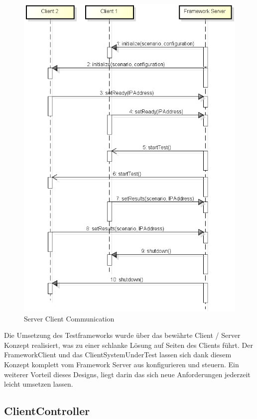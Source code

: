 \begin{figure}[H]
\begin{center}
\includegraphics[scale=0.5]{image_testFramework/Server_Client_Communication.png}
\end{center}
\caption{Server Client Communication}
\end{figure}

Die Umsetzung des Testframeworks wurde über das bewährte Client / Server Konzept realisiert, was zu einer schlanke Lösung auf Seiten des Clients führt. Der FrameworkClient und das ClientSystemUnderTest lassen sich dank die\-sem Konzept komplett vom Framework Server aus konfigurieren und steuern. Ein weiterer Vorteil dieses Designs, liegt darin das sich neue Anforderungen jederzeit leicht umsetzen lassen.


\subsection{ClientController}
\label{sec:clientController}
 
